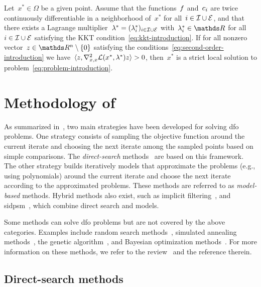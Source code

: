 \begin{theorem} %
    \label{thm:second-order-sufficient-conditions}
    Let~$x^{\ast} \in \Omega$ be a given point.
    Assume that the functions~$f$ and~$c_{i}$ are twice continuously differentiable in a neighborhood of~$x^{\ast}$ for all~$i \in \mathcal{I} \cup \mathcal{E}$, and that there exists a Lagrange multiplier~$\lambda^{\ast} = (\lambda_i^{\ast})_{i \in \mathcal{I} \cup \mathcal{E}}$ with~$\lambda_i^{\ast} \in \R$ for all~$i \in \mathcal{I} \cup \mathcal{E}$ satisfying the KKT condition~\cref{eq:kkt-introduction}.
    If for all nonzero vector~$z \in \R^n \setminus \set{0}$ satisfying the conditions~\cref{eq:second-order-introduction} we have~$\langle z, \nabla_{x, x}^2 \mathcal{L}(x^{\ast}, \lambda^{\ast}) z\rangle > 0$, then~$x^{\ast}$ is a strict local solution to problem~\cref{eq:problem-introduction}.
\end{theorem}

\section{Methodology of }

As summarized in~\cite{Conn_Scheinberg_Vicente_2009b}, two main strategies have been developed for solving \gls{dfo} problems.
One strategy consists of sampling the objective function around the current iterate and choosing the next iterate among the sampled points based on simple comparisons.
The \emph{direct-search} methods~\cite{Kolda_Lewis_Torczon_2003} are based on this framework.
The other strategy builds iteratively models that approximate the problems (e.g., using polynomials) around the current iterate and choose the next iterate according to the approximated problems.
These methods are referred to as \emph{model-based} methods.
Hybrid methods also exist, such as implicit filtering~\cite{Kelley_2011}, and \gls{sidpsm}~\cite{Custodio_Rocha_Vicente_2009}, which combine direct search and models.

Some methods can solve \gls{dfo} problems but are not covered by the above categories.
Examples include random search methods~\cite{Zhigljavsky_1991}, simulated annealing methods~\cite{Kirkpatrick_Gelatt_Vecchi_1983}, the genetic algorithm~\cite{Jong_1975,Holland_1975}, and Bayesian optimization methods~\cite{Mockus_1975,Shahriari_Etal_2016}.
For more information on these methods, we refer to the review~\cite{Larson_Menickelly_Wild_2019} and the reference therein.

\subsection{Direct-search methods}

